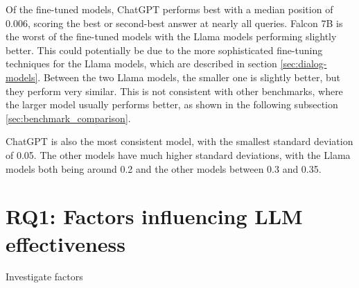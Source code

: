 Of the fine-tuned models, ChatGPT performs best with a median position of 0.006, scoring the best or second-best answer at nearly all queries.
Falcon 7B is the worst of the fine-tuned models with the Llama models performing slightly better.
This could potentially be due to the more sophisticated fine-tuning techniques for the Llama models, which are described in section \ref{sec:dialog-models}.
Between the two Llama models, the smaller one is slightly better, but they perform very similar.
This is not consistent with other benchmarks, where the larger model usually performs better, as shown in the following subsection \ref{sec:benchmark_comparison}.

ChatGPT is also the most consistent model, with the smallest standard deviation of 0.05.
The other models have much higher standard deviations, with the Llama models both being around 0.2 and the other models between 0.3 and 0.35.

\section{RQ1: Factors influencing LLM effectiveness}
Investigate factors

